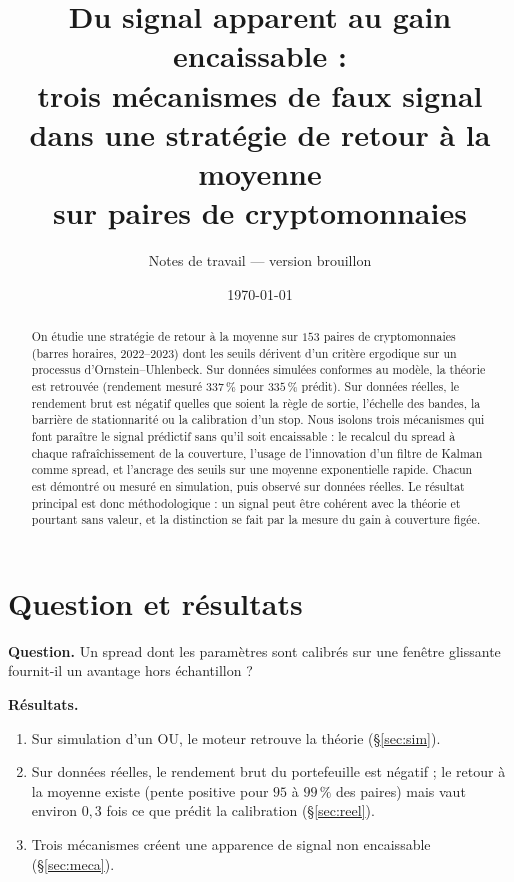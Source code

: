 \documentclass[11pt,a4paper]{article}
\title{Du signal apparent au gain encaissable :\\
trois mécanismes de faux signal dans une stratégie de retour à la moyenne\\
sur paires de cryptomonnaies}
\author{Notes de travail --- version brouillon}
\date{\today}
\theoremstyle{remark}
\begin{document}
\maketitle

\begin{abstract}
On étudie une stratégie de retour à la moyenne sur $153$ paires de cryptomonnaies (barres horaires, 2022--2023) dont les seuils
dérivent d'un critère ergodique sur un processus d'Ornstein--Uhlenbeck. Sur données simulées conformes au modèle, la théorie est
retrouvée (rendement mesuré $337\,\%$ pour $335\,\%$ prédit). Sur données réelles, le rendement brut est négatif quelles que soient la règle
de sortie, l'échelle des bandes, la barrière de stationnarité ou la calibration d'un stop. Nous isolons trois mécanismes qui font paraître
le signal prédictif sans qu'il soit encaissable : le recalcul du spread à chaque rafraîchissement de la couverture, l'usage de l'innovation d'un filtre
de Kalman comme spread, et l'ancrage des seuils sur une moyenne exponentielle rapide. Chacun est démontré ou mesuré en simulation, puis
observé sur données réelles. Le résultat principal est donc méthodologique : un signal peut être cohérent avec la théorie et pourtant sans valeur,
et la distinction se fait par la mesure du gain à couverture figée.
\end{abstract}

\section{Question et résultats}

\textbf{Question.} Un spread dont les paramètres sont calibrés sur une fenêtre glissante fournit-il un avantage hors échantillon ?

\textbf{Résultats.}
\begin{enumerate}[nosep]
\item Sur simulation d'un OU, le moteur retrouve la théorie (\S\ref{sec:sim}).
\item Sur données réelles, le rendement brut du portefeuille est négatif ; le retour à la moyenne existe (pente positive pour $95$ à $99\,\%$ des paires)
mais vaut environ $0{,}3$ fois ce que prédit la calibration (\S\ref{sec:reel}).
\item Trois mécanismes créent une apparence de signal non encaissable (\S\ref{sec:meca}).
\end{enumerate}
\end{document}

